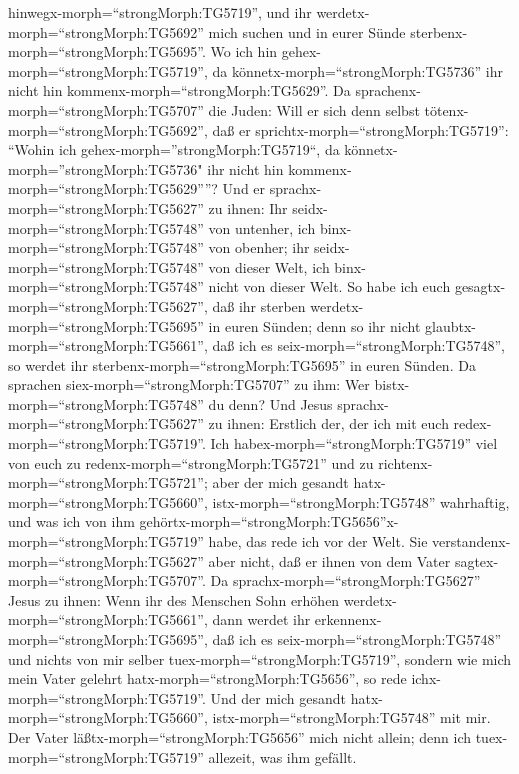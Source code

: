hinwegx-morph=``strongMorph:TG5719'', und ihr
werdetx-morph=``strongMorph:TG5692'' mich suchen und in eurer Sünde
sterbenx-morph=``strongMorph:TG5695''. Wo ich hin
gehex-morph=``strongMorph:TG5719'', da
könnetx-morph=``strongMorph:TG5736'' ihr nicht hin
kommenx-morph=``strongMorph:TG5629''.  Da
sprachenx-morph=``strongMorph:TG5707'' die Juden: Will er sich denn
selbst tötenx-morph=``strongMorph:TG5692'', daß er
sprichtx-morph=``strongMorph:TG5719'': ``Wohin ich
gehex-morph=''strongMorph:TG5719``, da
könnetx-morph=''strongMorph:TG5736" ihr nicht hin
kommenx-morph=``strongMorph:TG5629''''?  Und er
sprachx-morph=``strongMorph:TG5627'' zu ihnen: Ihr
seidx-morph=``strongMorph:TG5748'' von untenher, ich
binx-morph=``strongMorph:TG5748'' von obenher; ihr
seidx-morph=``strongMorph:TG5748'' von dieser Welt, ich
binx-morph=``strongMorph:TG5748'' nicht von dieser Welt. 
So habe ich euch gesagtx-morph=``strongMorph:TG5627'', daß ihr sterben
werdetx-morph=``strongMorph:TG5695'' in euren Sünden; denn so ihr nicht
glaubtx-morph=``strongMorph:TG5661'', daß ich es
seix-morph=``strongMorph:TG5748'', so werdet ihr
sterbenx-morph=``strongMorph:TG5695'' in euren Sünden.  Da
sprachen siex-morph=``strongMorph:TG5707'' zu ihm: Wer
bistx-morph=``strongMorph:TG5748'' du denn? Und Jesus
sprachx-morph=``strongMorph:TG5627'' zu ihnen: Erstlich der, der ich mit
euch redex-morph=``strongMorph:TG5719''.  Ich
habex-morph=``strongMorph:TG5719'' viel von euch zu
redenx-morph=``strongMorph:TG5721'' und zu
richtenx-morph=``strongMorph:TG5721''; aber der mich gesandt
hatx-morph=``strongMorph:TG5660'', istx-morph=``strongMorph:TG5748''
wahrhaftig, und was ich von ihm
gehörtx-morph=``strongMorph:TG5656''x-morph=``strongMorph:TG5719'' habe,
das rede ich vor der Welt.  Sie
verstandenx-morph=``strongMorph:TG5627'' aber nicht, daß er ihnen von
dem Vater sagtex-morph=``strongMorph:TG5707''.  Da
sprachx-morph=``strongMorph:TG5627'' Jesus zu ihnen: Wenn ihr des
Menschen Sohn erhöhen werdetx-morph=``strongMorph:TG5661'', dann werdet
ihr erkennenx-morph=``strongMorph:TG5695'', daß ich es
seix-morph=``strongMorph:TG5748'' und nichts von mir selber
tuex-morph=``strongMorph:TG5719'', sondern wie mich mein Vater gelehrt
hatx-morph=``strongMorph:TG5656'', so rede
ichx-morph=``strongMorph:TG5719''.  Und der mich gesandt
hatx-morph=``strongMorph:TG5660'', istx-morph=``strongMorph:TG5748'' mit
mir. Der Vater läßtx-morph=``strongMorph:TG5656'' mich nicht allein;
denn ich tuex-morph=``strongMorph:TG5719'' allezeit, was ihm gefällt.
